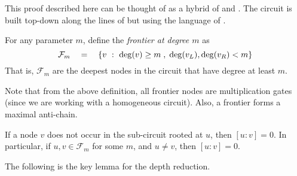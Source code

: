 This proof described here can be thought of as a hybrid of
\cite{vsbr83} and \cite{ajmv98}. 
The circuit is built top-down along
the lines of \cite{ajmv98} but using the language of \cite{vsbr83}.


\begin{definition}[Frontier]\label{defn:frontier}
For any parameter $m$, define the \emph{frontier at degree $m$} as
\[
\mathcal{F}_m \quad=\quad \left\{{v}\ : \ {\deg(v) \geq m\;,\; \deg(v_L), \deg(v_R) < m}\right\}
\]
That is, $\mathcal{F}_m$ are the deepest nodes in the circuit that have degree at least $m$. 
\end{definition}

Note that from the above definition, all frontier nodes are
multiplication gates (since we are working with a homogeneous
circuit). 
Also, a frontier forms a maximal anti-chain.

\begin{observation}\label{obs:vsbr-antichain}
  If a node $v$ does not occur in the sub-circuit rooted at $u$, then
  $[u:v] = 0$. 
In particular, if $u, v\in \mathcal{F}_m$ for some $m$, and $u \neq
  v$, then $[u:v]=0$.
\end{observation}

The following is the key lemma for the depth reduction. 


